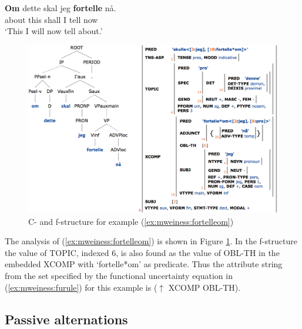 \documentclass[output=paper]{langsci/langscibook}
\begin{document}
\ea\label{ex:mweiness:fortelleom}
\gll \textbf{Om} dette skal jeg \textbf{fortelle} nå.\\
     about this shall I tell now\\
\glt `This I will now tell about.'
\z

%

\begin{figure}
  \includegraphics[width=\textwidth]{figures/fortelle-om-c-f.png}
  \caption{C- and f-structure for example (\ref{ex:mweiness:fortelleom})}
  \label{fig:mweiness:fortelle-om-c-f}
\end{figure}

The analysis of  (\ref{ex:mweiness:fortelleom}) is shown in Figure \ref{fig:mweiness:fortelle-om-c-f}.
In the f-structure the value of TOPIC, indexed 6, is also found as the value of OBL-TH in the embedded XCOMP with `fortelle*om' as predicate.
Thus the attribute string from the set specified by the functional uncertainty equation in (\ref{ex:mweiness:furule}) for this example is ($\uparrow$ XCOMP OBL-TH).

\subsection{Passive alternations}\label{sec:mweiness:vpidiomsyntax}
\end{document}
